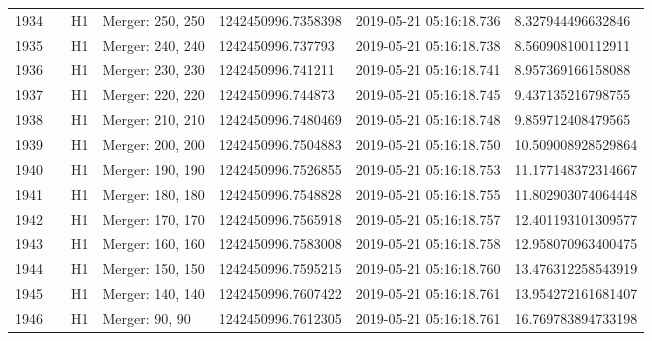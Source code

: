 \begin{longtable}{lllllll}
1934 &                                                    &       H1 &  Merger: 250, 250 &  1242450996.7358398 &  2019-05-21 05:16:18.736 &   8.327944496632846 \\
1935 &                                                    &       H1 &  Merger: 240, 240 &   1242450996.737793 &  2019-05-21 05:16:18.738 &   8.560908100112911 \\
1936 &                                                    &       H1 &  Merger: 230, 230 &   1242450996.741211 &  2019-05-21 05:16:18.741 &   8.957369166158088 \\
1937 &                                                    &       H1 &  Merger: 220, 220 &   1242450996.744873 &  2019-05-21 05:16:18.745 &   9.437135216798755 \\
1938 &                                                    &       H1 &  Merger: 210, 210 &  1242450996.7480469 &  2019-05-21 05:16:18.748 &   9.859712408479565 \\
1939 &                                                    &       H1 &  Merger: 200, 200 &  1242450996.7504883 &  2019-05-21 05:16:18.750 &  10.509008928529864 \\
1940 &                                                    &       H1 &  Merger: 190, 190 &  1242450996.7526855 &  2019-05-21 05:16:18.753 &  11.177148372314667 \\
1941 &                                                    &       H1 &  Merger: 180, 180 &  1242450996.7548828 &  2019-05-21 05:16:18.755 &  11.802903074064448 \\
1942 &                                                    &       H1 &  Merger: 170, 170 &  1242450996.7565918 &  2019-05-21 05:16:18.757 &  12.401193101309577 \\
1943 &                                                    &       H1 &  Merger: 160, 160 &  1242450996.7583008 &  2019-05-21 05:16:18.758 &  12.958070963400475 \\
1944 &                                                    &       H1 &  Merger: 150, 150 &  1242450996.7595215 &  2019-05-21 05:16:18.760 &  13.476312258543919 \\
1945 &                                                    &       H1 &  Merger: 140, 140 &  1242450996.7607422 &  2019-05-21 05:16:18.761 &  13.954272161681407 \\
1946 &                                                    &       H1 &    Merger: 90, 90 &  1242450996.7612305 &  2019-05-21 05:16:18.761 &  16.769783894733198 \\

\end{longtable}
